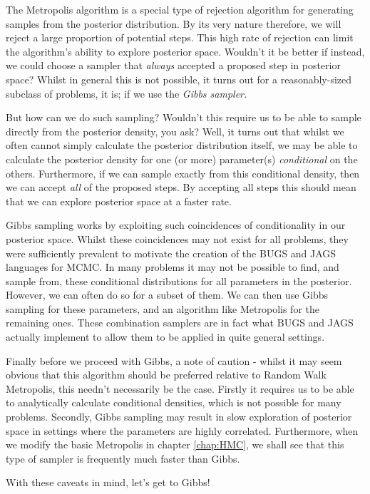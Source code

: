 \documentclass[11pt,fullpage]{book}
\begin{document}
The Metropolis algorithm is a special type of rejection algorithm for generating samples from the posterior distribution. By its very nature therefore, we will reject a large proportion of potential steps. This high rate of rejection can limit the algorithm's ability to explore posterior space. Wouldn't it be better if instead, we could choose a sampler that \textit{always} accepted a proposed step in posterior space? Whilst in general this is not possible, it turns out for a reasonably-sized subclass of problems, it is; if we use the \textit{Gibbs sampler.}  

But how can we do such sampling? Wouldn't this require us to be able to sample directly from the posterior density, you ask? Well, it turns out that whilst we often cannot simply calculate the posterior distribution itself, we may be able to calculate the posterior density for one (or more) parameter(s) \textit{conditional} on the others. Furthermore, if we can sample exactly from this conditional density, then we can accept \textit{all} of the proposed steps. By accepting all steps this should mean that we can explore posterior space at a faster rate. 

Gibbs sampling works by exploiting such coincidences of conditionality in our posterior space. Whilst these coincidences may not exist for all problems, they were sufficiently prevalent to motivate the creation of the BUGS and JAGS languages for MCMC. In many problems it may not be possible to find, and sample from, these conditional distributions for all parameters in the posterior. However, we can often do so for a subset of them. We can then use Gibbs sampling for these parameters, and an algorithm like Metropolis for the remaining ones. These combination samplers are in fact what BUGS and JAGS actually implement to allow them to be applied in quite general settings. 

Finally before we proceed with Gibbs, a note of caution - whilst it may seem obvious that this algorithm should be preferred relative to Random Walk Metropolis, this needn't necessarily be the case. Firstly it requires us to be able to analytically calculate conditional densities, which is not possible for many problems. Secondly, Gibbs sampling may result in slow exploration of posterior space in settings where the parameters are highly correlated. Furthermore, when we modify the basic Metropolis in chapter \ref{chap:HMC}, we shall see that this type of sampler is frequently much faster than Gibbs. 

With these caveats in mind, let's get to Gibbs!
\end{document}

